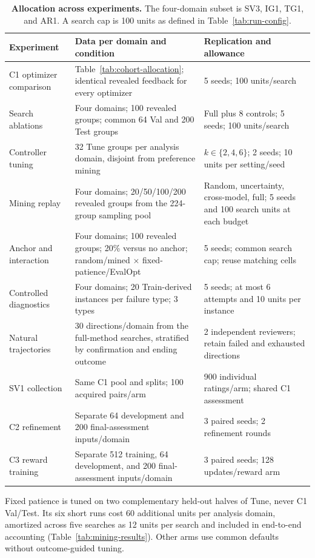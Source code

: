 \begin{table}[!htbp]
\caption{\textbf{Allocation across experiments.} The four-domain subset is SV3, IG1, TG1, and AR1. A search cap is 100 units as defined in Table~\ref{tab:run-config}.}
\label{tab:experiment-allocation}
\centering\small
\begin{tabularx}{\linewidth}{@{}P{2.4cm}YP{3.7cm}@{}}
\toprule
Experiment & Data per domain and condition & Replication and allowance\\
\midrule
C1 optimizer comparison & Table~\ref{tab:cohort-allocation}; identical revealed feedback for every optimizer & 5 seeds; 100 units/search\\
Search ablations & Four domains; 100 revealed groups; common 64 Val and 200 Test groups & Full plus 8 controls; 5 seeds; 100 units/search\\
Controller tuning & 32 Tune groups per analysis domain, disjoint from preference mining & $k\in\{2,4,6\}$; 2 seeds; 10 units per setting/seed\\
Mining replay & Four domains; 20/50/100/200 revealed groups from the 224-group sampling pool & Random, uncertainty, cross-model, full; 5 seeds and 100 search units at each budget\\
Anchor and interaction & Four domains; 100 revealed groups; 20\% versus no anchor; random/mined $\times$ fixed-patience/EvalOpt & 5 seeds; common search cap; reuse matching cells\\
Controlled diagnostics & Four domains; 20 Train-derived instances per failure type; 3 types & 5 seeds; at most 6 attempts and 10 units per instance\\
Natural trajectories & 30 directions/domain from the full-method searches, stratified by confirmation and ending outcome & 2 independent reviewers; retain failed and exhausted directions\\
SV1 collection & Same C1 pool and splits; 100 acquired pairs/arm & 900 individual ratings/arm; shared C1 assessment\\
C2 refinement & Separate 64 development and 200 final-assessment inputs/domain & 3 paired seeds; 2 refinement rounds\\
C3 reward training & Separate 512 training, 64 development, and 200 final-assessment inputs/domain & 3 paired seeds; 128 updates/reward arm\\
\bottomrule
\end{tabularx}
\end{table}

Fixed patience is tuned on two complementary held-out halves of Tune, never C1 Val/Test.
Its six short runs cost 60 additional units per analysis domain, amortized across five searches as 12 units per search and included in end-to-end accounting (Table~\ref{tab:mining-results}).
Other arms use common defaults without outcome-guided tuning.


